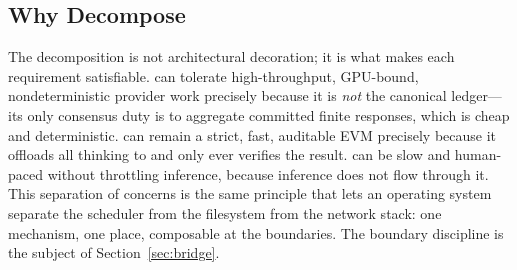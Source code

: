 \subsection{Why Decompose}

The decomposition is not architectural decoration; it is what makes each requirement satisfiable. \AChain{} can tolerate high-throughput, GPU-bound, nondeterministic provider work precisely because it is \emph{not} the canonical ledger---its only consensus duty is to aggregate committed finite responses, which is cheap and deterministic. \CChain{} can remain a strict, fast, auditable EVM precisely because it offloads all thinking to \AChain{} and only ever verifies the result. \GChain{} can be slow and human-paced without throttling inference, because inference does not flow through it. This separation of concerns is the same principle that lets an operating system separate the scheduler from the filesystem from the network stack: one mechanism, one place, composable at the boundaries. The boundary discipline is the subject of Section~\ref{sec:bridge}.

